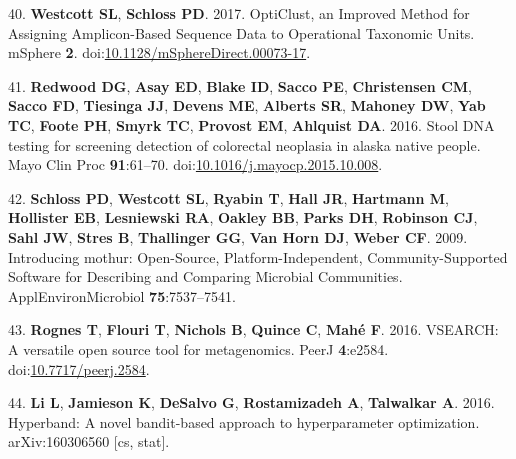 \documentclass[11pt,]{article}
\begin{document}
\hypertarget{ref-westcott_opticlust_2017}{}
40. \textbf{Westcott SL}, \textbf{Schloss PD}. 2017. OptiClust, an
Improved Method for Assigning Amplicon-Based Sequence Data to
Operational Taxonomic Units. mSphere \textbf{2}.
doi:\href{https://doi.org/10.1128/mSphereDirect.00073-17}{10.1128/mSphereDirect.00073-17}.

\hypertarget{ref-redwood_stool_2016}{}
41. \textbf{Redwood DG}, \textbf{Asay ED}, \textbf{Blake ID},
\textbf{Sacco PE}, \textbf{Christensen CM}, \textbf{Sacco FD},
\textbf{Tiesinga JJ}, \textbf{Devens ME}, \textbf{Alberts SR},
\textbf{Mahoney DW}, \textbf{Yab TC}, \textbf{Foote PH}, \textbf{Smyrk
TC}, \textbf{Provost EM}, \textbf{Ahlquist DA}. 2016. Stool DNA testing
for screening detection of colorectal neoplasia in alaska native people.
Mayo Clin Proc \textbf{91}:61--70.
doi:\href{https://doi.org/10.1016/j.mayocp.2015.10.008}{10.1016/j.mayocp.2015.10.008}.

\hypertarget{ref-schloss_introducing_2009}{}
42. \textbf{Schloss PD}, \textbf{Westcott SL}, \textbf{Ryabin T},
\textbf{Hall JR}, \textbf{Hartmann M}, \textbf{Hollister EB},
\textbf{Lesniewski RA}, \textbf{Oakley BB}, \textbf{Parks DH},
\textbf{Robinson CJ}, \textbf{Sahl JW}, \textbf{Stres B},
\textbf{Thallinger GG}, \textbf{Van Horn DJ}, \textbf{Weber CF}. 2009.
Introducing mothur: Open-Source, Platform-Independent,
Community-Supported Software for Describing and Comparing Microbial
Communities. ApplEnvironMicrobiol \textbf{75}:7537--7541.

\hypertarget{ref-rognes_vsearch_2016}{}
43. \textbf{Rognes T}, \textbf{Flouri T}, \textbf{Nichols B},
\textbf{Quince C}, \textbf{Mahé F}. 2016. VSEARCH: A versatile open
source tool for metagenomics. PeerJ \textbf{4}:e2584.
doi:\href{https://doi.org/10.7717/peerj.2584}{10.7717/peerj.2584}.

\hypertarget{ref-li_hyperband:_2016}{}
44. \textbf{Li L}, \textbf{Jamieson K}, \textbf{DeSalvo G},
\textbf{Rostamizadeh A}, \textbf{Talwalkar A}. 2016. Hyperband: A novel
bandit-based approach to hyperparameter optimization. arXiv:160306560
{[}cs, stat{]}.
\end{document}
